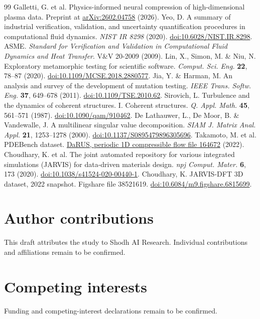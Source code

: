 \documentclass[10pt,a4paper,twocolumn]{article}
\newcommand{\doilink}[1]{\href{https://doi.org/#1}{doi:#1}}
\begin{document}
\begin{thebibliography}{99}
 Galletti, G. et al. Physics-informed neural compression of high-dimensional plasma data. Preprint at \href{https://arxiv.org/abs/2602.04758}{arXiv:2602.04758} (2026).
 Yeo, D. A summary of industrial verification, validation, and uncertainty quantification procedures in computational fluid dynamics. \emph{NIST IR 8298} (2020). \doilink{10.6028/NIST.IR.8298}.
 ASME. \emph{Standard for Verification and Validation in Computational Fluid Dynamics and Heat Transfer}. V\&V 20-2009 (2009).
 Lin, X., Simon, M. \& Niu, N. Exploratory metamorphic testing for scientific software. \emph{Comput. Sci. Eng.} \textbf{22}, 78--87 (2020). \doilink{10.1109/MCSE.2018.2880577}.
 Jia, Y. \& Harman, M. An analysis and survey of the development of mutation testing. \emph{IEEE Trans. Softw. Eng.} \textbf{37}, 649--678 (2011). \doilink{10.1109/TSE.2010.62}.
 Sirovich, L. Turbulence and the dynamics of coherent structures. I. Coherent structures. \emph{Q. Appl. Math.} \textbf{45}, 561--571 (1987). \doilink{10.1090/qam/910462}.
 De Lathauwer, L., De Moor, B. \& Vandewalle, J. A multilinear singular value decomposition. \emph{SIAM J. Matrix Anal. Appl.} \textbf{21}, 1253--1278 (2000). \doilink{10.1137/S0895479896305696}.
 Takamoto, M. et al. PDEBench dataset. \href{https://darus.uni-stuttgart.de/api/access/datafile/164672}{DaRUS, periodic 1D compressible flow file 164672} (2022).
 Choudhary, K. et al. The joint automated repository for various integrated simulations (JARVIS) for data-driven materials design. \emph{npj Comput. Mater.} \textbf{6}, 173 (2020). \doilink{10.1038/s41524-020-00440-1}.
 Choudhary, K. JARVIS-DFT 3D dataset, 2022 snapshot. Figshare file 38521619. \doilink{10.6084/m9.figshare.6815699}.
\end{thebibliography}
\endgroup

\section*{Author contributions}
This draft attributes the study to Shodh AI Research. Individual contributions and affiliations remain to be confirmed.

\section*{Competing interests}
Funding and competing-interest declarations remain to be confirmed.

\balance
\end{document}
